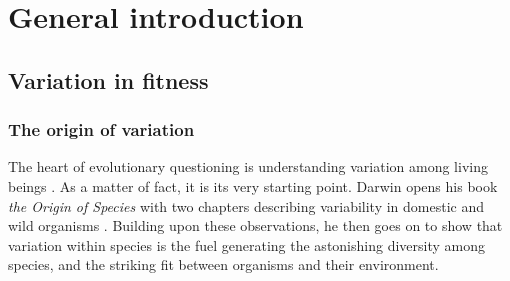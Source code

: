 
\chapter[\texorpdfstring{Chapter 1 \\ General introduction}{Chapter 1 General introduction}]{General introduction}
\label{chap:intro}


\section{Variation in fitness}
\subsection{The origin of variation}
The heart of evolutionary questioning is understanding variation among living beings \parencite{Lynch1998, Wayne2006, Kruuk2014}. As a matter of fact, it is its very starting point. Darwin opens his book \emph{the Origin of Species} with two chapters describing variability in domestic and wild organisms \parencite{Darwin1859}.
Building upon these observations, he then goes on to show that variation within species is the fuel generating the astonishing diversity among species, and the striking fit between organisms and their environment.

